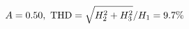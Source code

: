 \documentclass[preview]{standalone}
\begin{document}
\begin{align*}
\special{dvisvgm:raw <g id='unique000'>}A=0.50,\ \text{THD}=\sqrt{H_2^2+H_3^2}/H_1=9.7\%\special{dvisvgm:raw </g>}
\end{align*}
\end{document}
